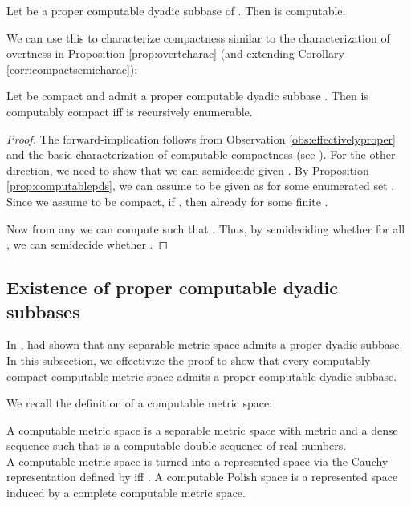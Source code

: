 \documentclass{eptcs-modified}
\begin{document}
\begin{observation}
\label{obs:effectivelyproper}
Let  be a proper computable dyadic subbase of . Then  is computable.
\end{observation}

We can use this to characterize compactness similar to the characterization of overtness in Proposition \ref{prop:overtcharac} (and extending Corollary \ref{corr:compactsemicharac}):

\begin{proposition}
\label{prop:compactcharac}
Let  be compact and admit a proper computable dyadic subbase .
Then  is computably compact iff  is recursively enumerable.
\begin{proof}
The forward-implication follows from Observation \ref{obs:effectivelyproper} and the basic characterization of computable compactness (see \cite{pauly-synthetic}). For the other direction, we need to show that we can semidecide  given . By Proposition \ref{prop:computablepds}, we can assume  to be given as  for some enumerated set . Since we assume  to be compact, if , then already  for some finite .

Now from any  we can compute  such that . Thus, by semideciding whether  for all , we can semidecide whether  .
\end{proof}
\end{proposition}

\subsection{Existence of proper computable dyadic subbases}
\label{sec:existenceproper}

In \cite[Section 3.1]{tsukamoto},  had shown that any separable metric space admits a proper dyadic subbase.
In this subsection, we effectivize the proof to show that every computably compact computable metric space admits a proper computable dyadic subbase.

We recall the definition of a computable metric space:

\begin{definition}
A computable metric space  is a separable metric space  with metric  and a dense sequence  such that  is a computable double sequence of real numbers.\\

A computable metric space is turned into a represented space via the Cauchy representation  defined by  iff . A computable Polish space is a represented space induced by a complete computable metric space.
\end{definition}
\end{document}
